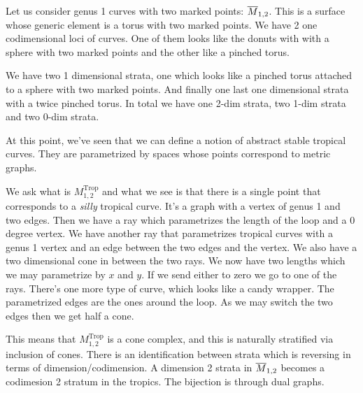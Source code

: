 \documentclass[12pt]{memoir}
\DeclareMathOperator{\Trop}{Trop}
\begin{document}
\begin{Ex}
    Let us consider genus 1 curves with two marked points: $\overline M_{1,2}$. This is a surface whose generic element is a torus with two marked points. We have 2 one codimensional loci of curves. One of them looks like the donuts with with a sphere with two marked points and the other like a pinched torus.\par 
    We have two 1 dimensional strata, one which looks like a pinched torus attached to a sphere with two marked points. And finally one last one dimensional strata with a twice pinched torus. In total we have one 2-dim strata, two 1-dim strata and two 0-dim strata.
\end{Ex}

At this point, we've seen that we can define a notion of abstract stable tropical curves. They are parametrized by spaces whose points correspond to metric graphs.

\begin{Ex}
    We ask what is $M_{1,2}^{\Trop}$ and what we see is that there is a single point that corresponds to a \emph{silly} tropical curve. It's a graph with a vertex of genus 1 and two edges. Then we have a ray which parametrizes the length of the loop and a 0 degree vertex. We have another ray that parametrizes tropical curves with a genus 1 vertex and an edge between the two edges and the vertex. We also have a two dimensional cone in between the two rays. We now have two lengths which we may parametrize by $x$ and $y$. If we send either to zero we go to one of the rays. There's one more type of curve, which looks like a candy wrapper. The parametrized edges are the ones around the loop. As we may switch the two edges then we get half a cone.\par 
    This means that $M_{1,2}^{\Trop}$ is a cone complex, and this is naturally stratified via inclusion of cones. There is an identification between strata which is reversing in terms of dimension/codimension. A dimension 2 strata in $\overline{M}_{1,2}$ becomes a codimesion 2 stratum in the tropics. The bijection is through dual graphs.
\end{Ex}
\end{document}
